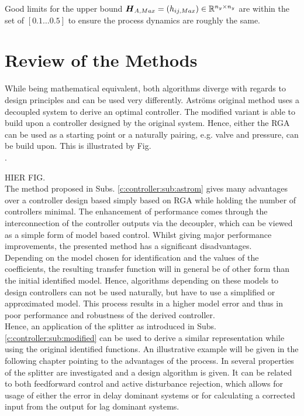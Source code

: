 Good limits for the upper bound $\mbox{\boldmath$H$}_{A,Max} = \left( h_{ij,Max}\right) \in \mathbb{R}^{n_y \times n_y}$ are within the set of $\left[0.1 \dots 0.5 \right]$ to ensure the process dynamics are roughly the same.

\section{Review of the Methods}\label{c:controller:s:review}

While being mathematical equivalent, both algorithms diverge with regards to design principles and can be used very differently. Astr\"oms original method uses a decoupled system to derive an optimal controller. The modified variant is able to build upon a controller designed by the original system. Hence, either the RGA can be used as a starting point or a naturally pairing, e.g. valve and pressure, can be build upon. This is illustrated by Fig. \\.

HIER FIG.\\

The method proposed in Subs. \ref{c:controller:sub:astrom} gives many advantages over a controller design based simply based on RGA while holding the number of controllers minimal. The enhancement of performance comes through the interconnection of the controller outputs via the decoupler, which can be viewed as a simple form of model based control. Whilst giving major performance improvements, the presented method has a significant disadvantages.\\

Depending on the model chosen for identification and the values of the coefficients, the resulting transfer function will in general be of other form than the initial identified model. Hence, algorithms depending on these models to design controllers can not be used naturally, but have to use a simplified or approximated model. This process results in a higher model error and thus in poor performance and robustness of the derived controller.\\

Hence, an application of the splitter as introduced in Subs.\ref{c:controller:sub:modified} can be used to derive a similar representation while using the original identified functions. An illustrative example will be given in the following chapter pointing to the advantages of the process. In \cite{Wang2006} several properties of the splitter are investigated and a design algorithm is given. It can be related to both feedforward control and active disturbance rejection, which allows for usage of either the error in delay dominant systems or for calculating a corrected input from the output for lag dominant systems.

